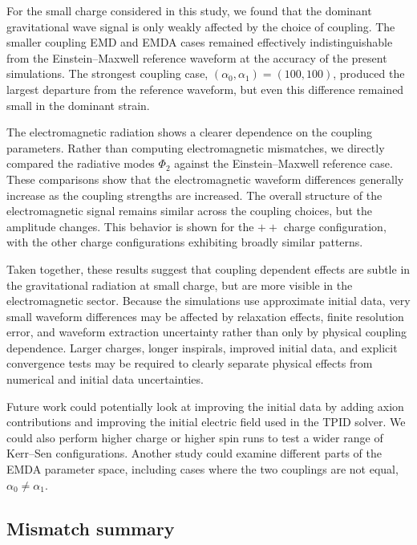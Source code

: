 For the small charge considered in this study, we found that the dominant gravitational wave signal is only weakly affected by the choice of coupling. The smaller coupling EMD and EMDA cases remained effectively indistinguishable from the Einstein--Maxwell reference waveform at the accuracy of the present simulations. The strongest coupling case, $(\alpha_0,\alpha_1)=(100,100)$, produced the largest departure from the reference waveform, but even this difference remained small in the dominant strain.

The electromagnetic radiation shows a clearer dependence on the coupling parameters. Rather than computing electromagnetic mismatches, we directly compared the radiative modes $\Phi_2$ against the Einstein--Maxwell reference case. These comparisons show that the electromagnetic waveform differences generally increase as the coupling strengths are increased. The overall structure of the electromagnetic signal remains similar across the coupling choices, but the amplitude changes. This behavior is shown for the $++$ charge configuration, with the other charge configurations exhibiting broadly similar patterns.

Taken together, these results suggest that coupling dependent effects are subtle in the gravitational radiation at small charge, but are more visible in the electromagnetic sector. Because the simulations use approximate initial data, very small waveform differences may be affected by relaxation effects, finite resolution error, and waveform extraction uncertainty rather than only by physical coupling dependence. Larger charges, longer inspirals, improved initial data, and explicit convergence tests may be required to clearly separate physical effects from numerical and initial data uncertainties.

Future work could potentially look at improving the initial data by adding axion contributions and improving the initial electric field used in the TPID solver. We could also perform higher charge or higher spin runs to test a wider range of Kerr--Sen configurations. Another study could examine different parts of the EMDA parameter space, including cases where the two couplings are not equal, $\alpha_0 \neq \alpha_1$.
\subsection{Mismatch summary}

